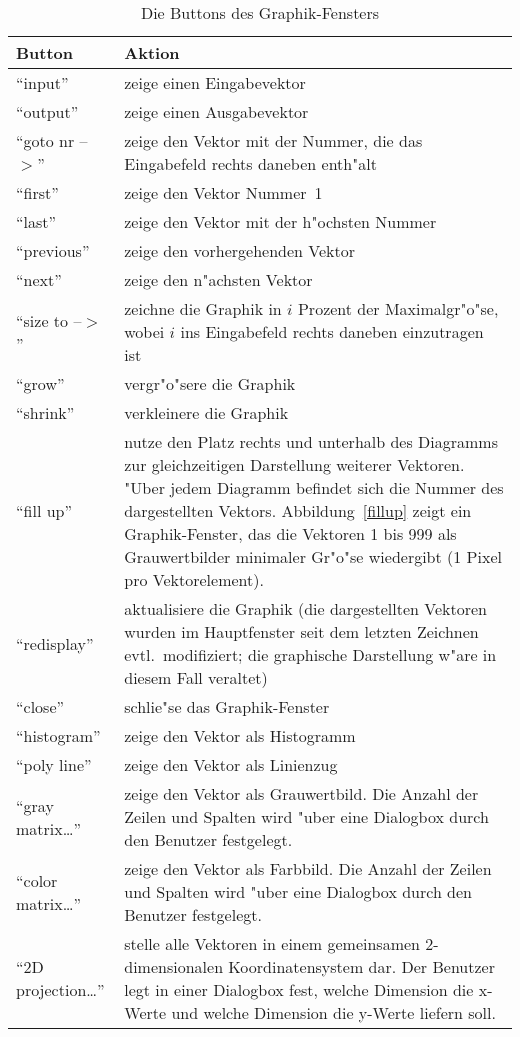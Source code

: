 \begin{table}[ht]
\begin{tabular}{lp{10.8cm}}
{\bf Button} & {\bf Aktion} \\ \hline
"`input"' & zeige einen Eingabevektor \\
"`output"' & zeige einen Ausgabevektor \\
"`goto nr --$>$"' & zeige den Vektor mit der Nummer, die das Eingabefeld rechts
daneben enth"alt \\
"`first"' & zeige den Vektor Nummer~1 \\
"`last"' & zeige den Vektor mit der h"ochsten Nummer \\
"`previous"' & zeige den vorhergehenden Vektor \\
"`next"' & zeige den n"achsten Vektor \\
"`size to --$>$"' & zeichne die Graphik in $i$ Prozent der Maximalgr"o"se, wobei
$i$ ins Eingabefeld rechts daneben einzutragen ist \\
"`grow"' & vergr"o"sere die Graphik \\
"`shrink"' & verkleinere die Graphik \\
"`fill up"' & nutze den Platz rechts und unterhalb des Diagramms zur 
gleichzeitigen Darstellung weiterer Vektoren.
"Uber jedem Diagramm befindet sich die Nummer des dargestellten Vektors.
Abbildung~\ref{fillup} zeigt ein Graphik-Fenster, das die Vektoren 1 bis 999
als Grauwertbilder minimaler Gr"o"se wiedergibt (1 Pixel pro Vektorelement).
  \\
"`redisplay"' & aktualisiere die Graphik (die dargestellten Vektoren
wurden im Hauptfenster seit dem letzten Zeichnen evtl.~modifiziert;
die graphische Darstellung w"are in diesem Fall veraltet) \\
"`close"' & schlie"se das Graphik-Fenster \\
"`histogram"' & zeige den Vektor als Histogramm \\
"`poly line"' & zeige den Vektor als Linienzug \\
"`gray matrix\ldots"' & zeige den Vektor als Grauwertbild. 
Die Anzahl der Zeilen und Spalten wird "uber eine Dialogbox durch den 
Benutzer festgelegt. \\
"`color matrix\ldots"' & zeige den Vektor als Farbbild.
Die Anzahl der Zeilen und Spalten wird "uber eine Dialogbox durch den
Benutzer festgelegt. \\
"`2D projection\ldots"' & stelle alle Vektoren in einem gemeinsamen
2-dimensionalen Koordinatensystem dar.
Der Benutzer legt in einer Dialogbox fest, welche Dimension die x-Werte
und welche Dimension die y-Werte liefern soll. 
\end{tabular}
\caption{\label{gwcomms} Die Buttons des Graphik-Fensters}
\end{table}

